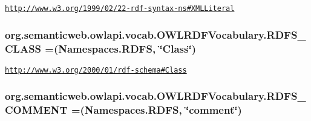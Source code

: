 \href{http://www.w3.org/1999/02/22-rdf-syntax-ns#XMLLiteral}{\tt http\-://www.\-w3.\-org/1999/02/22-\/rdf-\/syntax-\/ns\#\-X\-M\-L\-Literal} \hypertarget{enumorg_1_1semanticweb_1_1owlapi_1_1vocab_1_1_o_w_l_r_d_f_vocabulary_a430e15b70fd540b0da96defddaac8868}{
\subsubsection[{R\-D\-F\-S\-\_\-\-C\-L\-A\-S\-S}]{\setlength{\rightskip}{0pt plus 5cm}org.\-semanticweb.\-owlapi.\-vocab.\-O\-W\-L\-R\-D\-F\-Vocabulary.\-R\-D\-F\-S\-\_\-\-C\-L\-A\-S\-S =({\bf Namespaces.\-R\-D\-F\-S}, \char`\"{}Class\char`\"{})}}\label{enumorg_1_1semanticweb_1_1owlapi_1_1vocab_1_1_o_w_l_r_d_f_vocabulary_a430e15b70fd540b0da96defddaac8868}
\href{http://www.w3.org/2000/01/rdf-schema#Class}{\tt http\-://www.\-w3.\-org/2000/01/rdf-\/schema\#\-Class} \hypertarget{enumorg_1_1semanticweb_1_1owlapi_1_1vocab_1_1_o_w_l_r_d_f_vocabulary_abc2eb4c33451c74fd830e8e089387f5e}{
\subsubsection[{R\-D\-F\-S\-\_\-\-C\-O\-M\-M\-E\-N\-T}]{\setlength{\rightskip}{0pt plus 5cm}org.\-semanticweb.\-owlapi.\-vocab.\-O\-W\-L\-R\-D\-F\-Vocabulary.\-R\-D\-F\-S\-\_\-\-C\-O\-M\-M\-E\-N\-T =({\bf Namespaces.\-R\-D\-F\-S}, \char`\"{}comment\char`\"{})}}\label{enumorg_1_1semanticweb_1_1owlapi_1_1vocab_1_1_o_w_l_r_d_f_vocabulary_abc2eb4c33451c74fd830e8e089387f5e}
